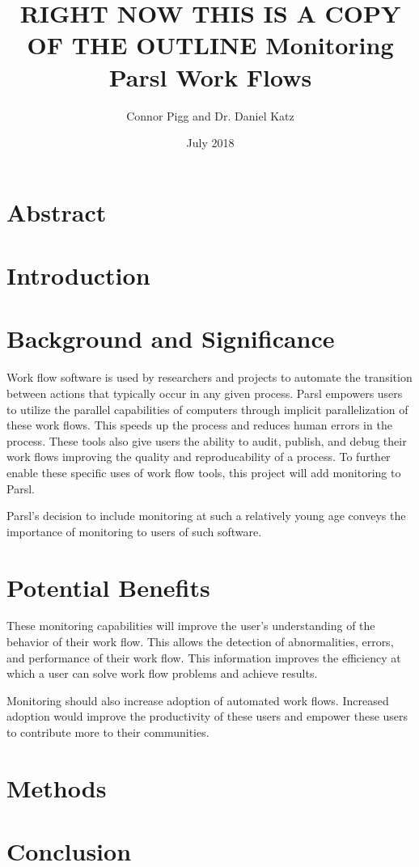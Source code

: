 \documentclass{article}
\title{\textbf{RIGHT NOW THIS IS A COPY OF THE OUTLINE}
Monitoring Parsl Work Flows}
\author{Connor Pigg and Dr. Daniel Katz}
\date{July 2018}
\begin{document}
\maketitle

\section{Abstract}

\pagebreak

\section{Introduction}


\section{Background and Significance}
Work flow software is used by researchers and projects to automate the transition between actions that typically occur in any given process.
Parsl empowers users to utilize the parallel capabilities of computers through implicit parallelization of these work flows.
This speeds up the process and reduces human errors in the process.
These tools also give users the ability to audit, publish, and debug their work flows improving the quality and reproducability of a process.
To further enable these specific uses of work flow tools, this project will add monitoring to Parsl.

Parsl's decision to include monitoring at such a relatively young age conveys the importance of monitoring to users of such software.

\section{Potential Benefits}
These monitoring capabilities will improve the user's understanding of the behavior of their work flow.
This allows the detection of abnormalities, errors, and performance of their work flow.
This information improves the efficiency at which a user can solve work flow problems and achieve results.

Monitoring should also increase adoption of automated work flows.
Increased adoption would improve the productivity of these users and empower these users to contribute more to their communities.

\section{Methods}


\section{Conclusion}




\end{document}
